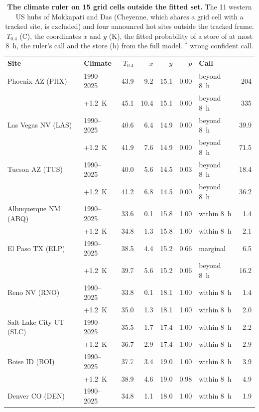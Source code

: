 \begin{table}[htbp]
\centering
\footnotesize
\setlength{\tabcolsep}{4pt}
\caption{\textbf{The climate ruler on 15 grid cells outside the fitted set.} The 11 western US hubs of Mokkapati and Das (Cheyenne, which shares a grid cell with a tracked site, is excluded) and four announced hot sites outside the tracked frame. $T_{0.4}$ (\textdegree{}C), the coordinates $x$ and $y$ (K), the fitted probability of a store of at most 8~h, the ruler's call and the store \hstar{} (h) from the full model. $^{\ast}$ wrong confident call.}\label{tab:s15}
\begin{tabular}{@{}llrrrrlr@{}}
\toprule
Site & Climate & $T_{0.4}$ & $x$ & $y$ & $p$ & Call & \hstar{}\\
\midrule
Phoenix AZ (PHX) & 1990--2025 & 43.9 & 9.2 & 15.1 & 0.00 & beyond 8~h & 204 \\
 & +1.2~K & 45.1 & 10.4 & 15.1 & 0.00 & beyond 8~h & 335 \\
Las Vegas NV (LAS) & 1990--2025 & 40.6 & 6.4 & 14.9 & 0.00 & beyond 8~h & 39.9 \\
 & +1.2~K & 41.9 & 7.6 & 14.9 & 0.00 & beyond 8~h & 71.5 \\
Tucson AZ (TUS) & 1990--2025 & 40.0 & 5.6 & 14.5 & 0.03 & beyond 8~h & 18.4 \\
 & +1.2~K & 41.2 & 6.8 & 14.5 & 0.00 & beyond 8~h & 36.2 \\
Albuquerque NM (ABQ) & 1990--2025 & 33.6 & 0.1 & 15.8 & 1.00 & within 8~h & 1.4 \\
 & +1.2~K & 34.8 & 1.3 & 15.8 & 1.00 & within 8~h & 2.1 \\
El Paso TX (ELP) & 1990--2025 & 38.5 & 4.4 & 15.2 & 0.66 & marginal & 6.5 \\
 & +1.2~K & 39.7 & 5.6 & 15.2 & 0.06 & beyond 8~h & 16.2 \\
Reno NV (RNO) & 1990--2025 & 33.8 & 0.1 & 18.1 & 1.00 & within 8~h & 1.4 \\
 & +1.2~K & 35.0 & 1.3 & 18.1 & 1.00 & within 8~h & 2.0 \\
Salt Lake City UT (SLC) & 1990--2025 & 35.5 & 1.7 & 17.4 & 1.00 & within 8~h & 2.2 \\
 & +1.2~K & 36.7 & 2.9 & 17.4 & 1.00 & within 8~h & 2.9 \\
Boise ID (BOI) & 1990--2025 & 37.7 & 3.4 & 19.0 & 1.00 & within 8~h & 3.9 \\
 & +1.2~K & 38.9 & 4.6 & 19.0 & 0.98 & within 8~h & 4.9 \\
Denver CO (DEN) & 1990--2025 & 34.8 & 1.1 & 18.0 & 1.00 & within 8~h & 1.9 \\

\end{tabular}
\end{table}
